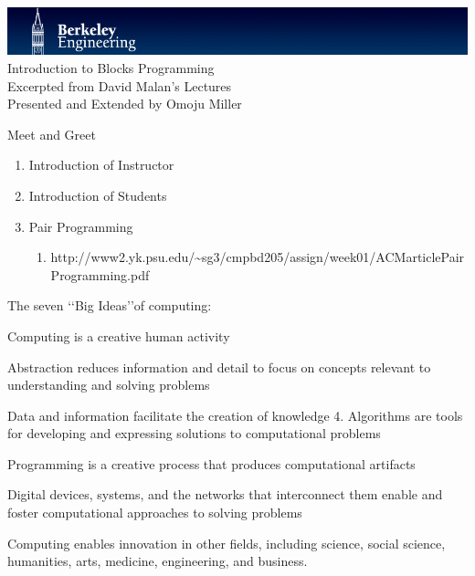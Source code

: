 \documentclass[11pt]{article}
\begin{document}
\begin{center}
\includegraphics[scale=0.5]{UCBEngr_Logo}\\
\vspace{40mm}
{\huge Introduction to Blocks Programming}\\
Excerpted from David Malan's Lectures\\
Presented and Extended by Omoju Miller
\end{center}


\newpage
\begin{center}
{\Huge Meet and Greet}
\vspace{10mm}
\begin{enumerate}
\item {\Large Introduction of Instructor}
\item{\Large  Introduction of Students}
\item {\Large Pair Programming}
\begin{enumerate}
\item{\Large  http://www2.yk.psu.edu/\~{}sg3/cmpbd205/assign/week01/ACMarticlePairProgramming.pdf }
\end{enumerate}
\end{enumerate}
\end{center}

\newpage
\begin{center}
{\Huge The seven \lq\lq Big Ideas\rq\rq of computing:}
\vspace{10mm}
\begin{enumerate}
{\Large
\item Computing is a creative human activity
\item Abstraction reduces information and detail to focus on concepts relevant to understanding and solving problems
\item Data and information facilitate the creation of knowledge 4. Algorithms are tools for developing and expressing solutions to computational problems
\item Programming is a creative process that produces computational artifacts
\item Digital devices, systems, and the networks that interconnect them enable and foster computational approaches to solving problems
\item Computing enables innovation in other fields, including science, social science, humanities, arts, medicine, engineering, and business. }
\end{enumerate}
\end{center}
\end{document}
